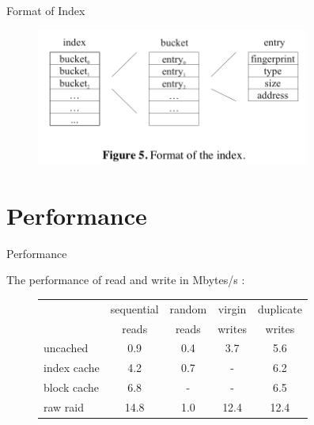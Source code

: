 \begin{frame}{Format of Index}

\begin{figure}
\includegraphics[width = 9cm]{pic5.png}
\end{figure}

\end{frame}

\section{Performance}\label{performance}

\begin{frame}{Performance}

The performance of read and write in Mbytes/s :

\begin{figure}

\begin{tabular}{lcccc}
\hline
           &   sequential  &  random  &  virgin  & duplicate \\
           &      reads    &  reads   &  writes  &   writes \\
\hline
uncached      &    0.9        &       0.4    &     3.7      &      5.6 \\
index cache   &    4.2        &       0.7    &      -         &    6.2 \\
block cache   &    6.8        &        -     &      -         &    6.5 \\
raw raid      &    14.8       &       1.0    &     12.4     &     12.4 \\
\hline
\end{tabular}
\end{figure}

\end{frame}

